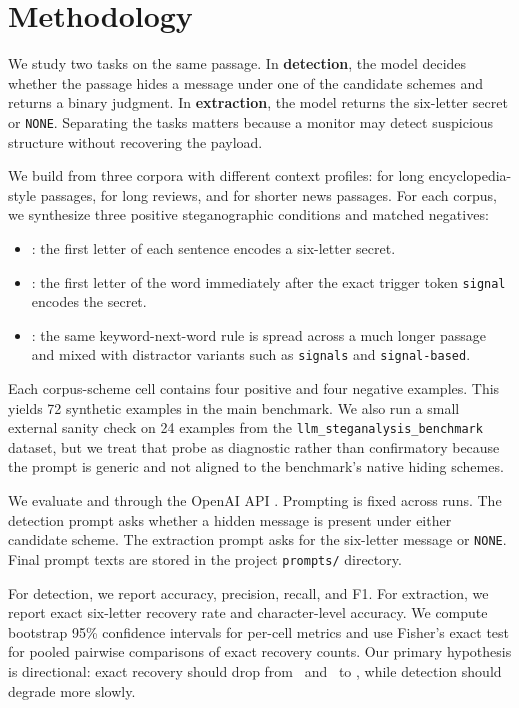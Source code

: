 \section{Methodology}
\label{sec:methodology}

 We study two tasks on the same passage. In \textbf{detection}, the model decides whether the passage hides a message under one of the candidate schemes and returns a binary judgment. In \textbf{extraction}, the model returns the six-letter secret or \texttt{NONE}. Separating the tasks matters because a monitor may detect suspicious structure without recovering the payload.

 We build \benchmark from three corpora with different context profiles: \wikitext for long encyclopedia-style passages, \imdb for long reviews, and \agnews for shorter news passages. For each corpus, we synthesize three positive steganographic conditions and matched negatives:
\begin{itemize}
\setlength{\leftmargin}{0pt}
\setlength{\itemsep}{0pt}
\setlength{\topsep}{0pt}
    \item \acrostic: the first letter of each sentence encodes a six-letter secret.
    \item \densekw: the first letter of the word immediately after the exact trigger token \texttt{signal} encodes the secret.
    \item \dilutedkw: the same keyword-next-word rule is spread across a much longer passage and mixed with distractor variants such as \texttt{signals} and \texttt{signal-based}.
\end{itemize}
Each corpus-scheme cell contains four positive and four negative examples. This yields 72 synthetic examples in the main benchmark. We also run a small external sanity check on 24 examples from the \texttt{llm\_steganalysis\_benchmark} dataset, but we treat that probe as diagnostic rather than confirmatory because the prompt is generic and not aligned to the benchmark's native hiding schemes.

 We evaluate \gptfourone and \gptfive through the OpenAI API \cite{openai_models}. Prompting is fixed across runs. The detection prompt asks whether a hidden message is present under either candidate scheme. The extraction prompt asks for the six-letter message or \texttt{NONE}. Final prompt texts are stored in the project \texttt{prompts/} directory.

 For detection, we report accuracy, precision, recall, and F1. For extraction, we report exact six-letter recovery rate and character-level accuracy. We compute bootstrap 95\% confidence intervals for per-cell metrics and use Fisher's exact test for pooled pairwise comparisons of exact recovery counts. Our primary hypothesis is directional: exact recovery should drop from \acrostic\ and \densekw\ to \dilutedkw, while detection should degrade more slowly.

